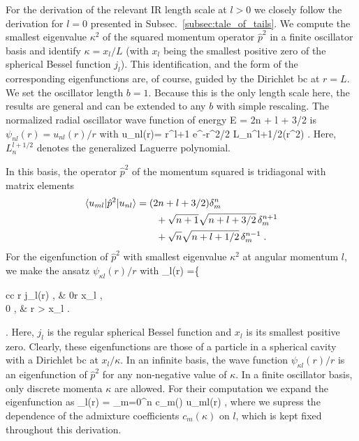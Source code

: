 	For the derivation of the relevant IR length scale at $l>0$ we closely
	follow the derivation for $l=0$ presented in
	Subsec.~\ref{subsec:tale_of_tails}.  We compute the smallest eigenvalue
	$\kappa^2$ of the squared momentum operator $\hat{p}^2$ in a finite
	oscillator basis and identify $\kappa =x_l/L$ (with $x_l$ being the
	smallest positive zero of the spherical Bessel function $j_l$). This
	identification, and the form of the corresponding eigenfunctions are,
	of course, guided by the Dirichlet bc at $r=L$.  We set the oscillator
	length $b=1$.  Because this is the only length scale here, the results
	are general and can be extended to any $b$ with simple rescaling.
	The normalized radial	oscillator wave function of energy
	\beq
	  E = 2n + l + 3/2
	\eeq
	is $\psi_{nl}(r)=u_{nl}(r)/r$ with
	\beq
	u_{nl}(r)= r^{l+1} e^{-r^2/2}
	L_{n}^{l+1/2}(r^2) \;.
	\eeq
	Here, $L_n^{l+1/2}$ denotes the generalized Laguerre polynomial.

	In this basis, the operator $\hat{p}^2$ of the momentum squared is
	tridiagonal with matrix elements
	\begin{align}
	\langle u_{ml}|\hat{p}^2|u_{nl}\rangle &= (2n+l+3/2)\delta_m^n \nonumber\\
	   & \qquad \null +\sqrt{n+1}
	   \sqrt{n+l+3/2}\,\delta_m^{n+1} \nonumber \\
	  & \qquad \null +\sqrt{n}\sqrt{n+l+1/2}\,\delta_m^{n-1} \;.
	\end{align}
	For the eigenfunction of $\hat{p}^2$ with smallest eigenvalue
	$\kappa^2$ at angular momentum $l$, we make the ansatz
	$\psi_{\kappa l}(r)/r$ with
	\bea
	\label{eq:eigen_l_gen}
	\psi_{\kappa l}(r) =\left\{\begin{array}{cc}
	\kappa r j_l(\kappa r) \;, & 0\le \kappa r \le x_l \;, \\
	0 \;, & \kappa r > x_l \;.\end{array}\right.
	\eea
	Here, $j_l$ is the regular spherical Bessel function and $x_l$ is its
	smallest positive zero.  Clearly, these eigenfunctions are those of a
	particle in a spherical cavity with a Dirichlet bc at $x_l/\kappa$. In
	an infinite basis, the wave function $\psi_{\kappa l}(r)/r$ is an
	eigenfunction of $\hat{p}^2$ for any non-negative value of $\kappa$.
	In a finite oscillator basis, only discrete momenta $\kappa$ are
	allowed.  For their computation we expand the eigenfunction as
	\beq
	\psi_{\kappa l}(r) = \sum_{m=0}^{n} c_m(\kappa) u_{ml}(r) \;,
	\eeq
	where we supress the dependence of the admixture coefficients
	$c_m(\kappa)$ on $l$, which is kept fixed throughout this derivation.

